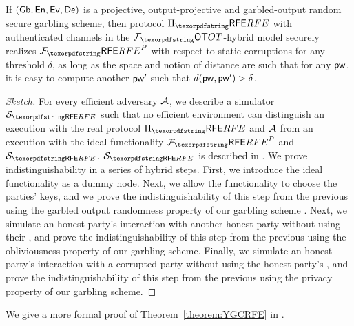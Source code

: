\begin{theorem}
\label{theorem:YGCRFE}
If $(\mathsf{Gb}, \mathsf{En}, \mathsf{Ev}, \mathsf{De})$ is %
a projective, output-projective and garbled-output random secure garbling scheme,
then
protocol $\Prfe$ with authenticated channels in the $\Fot$-hybrid model securely realizes $\Frfe^{P}$  with respect to static corruptions for any threshold $\delta$, 
as long as the \password space and notion of distance are such that for any \password $\mathsf{pw}$, it is easy to compute another \password $\mathsf{pw}'$ such that $d(\mathsf{pw}, \mathsf{pw}') > \delta$.\iftoggle{full}{\footnote{This is used in the argument of indistinguishability of Games~\printgame{YGCRFEbuildF} and \printgame{YGCRFEkeyshonestclose} in Appendix~\ref{sec:rfeproof}.}}{}
\end{theorem}
\begin{proof}[Sketch]
For every efficient adversary $\mathcal{A}$, we describe a simulator $\SimYGCRFE$ such that no efficient environment can distinguish an execution with the real protocol $\Prfe$ and $\mathcal{A}$ from an execution with the ideal functionality $\Frfe^{P}$ and $\SimYGCRFE$.
$\SimYGCRFE$ is described in \iftoggle{full}{Figure~\ref{fig:SimulatorYGCRFE}}{the full version of this paper}.
We prove indistinguishability in a series of hybrid steps.
First, we introduce the ideal functionality as a dummy node.
Next, we allow the functionality to choose the parties' keys, and we prove the indistinguishability of this step from the previous using the garbled output randomness property of our garbling scheme \iftoggle{full}{(Definition~\ref{def:garbledoutputrandomness}, Theorem~\ref{theorem:garbledoutputrandomness})}{}.
Next, we simulate an honest party's interaction with another honest party without using their \password, and prove the indistinguishability of this step from the previous using the obliviousness property of our garbling scheme. %
Finally, we simulate an honest party's interaction with a corrupted party without using the honest party's \password, and prove the indistinguishability of this step from the previous using the privacy property of our garbling scheme. %
\end{proof}
We give a more formal proof of Theorem~\ref{theorem:YGCRFE} in .
